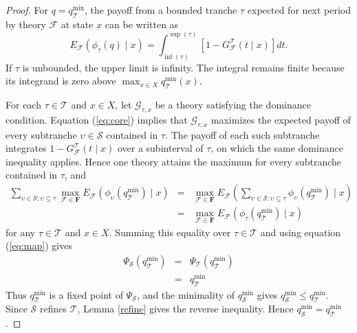 \documentclass[11pt]{article}
\theoremstyle{plain}
\begin{document}
\begin{proof}
For $q=q_{\mathcal{T}}^{\min}$, the payoff from a bounded tranche $\tau$ expected for next period by theory $\mathcal{F}$ at state $x$ can be written as
\begin{equation}
E_{\mathcal{F}}
\left(\phi_\tau(q)\mid x\right)
=
\int_{\inf(\tau)}^{\sup(\tau)}
\left[1-G^\mathcal{T}_{\mathcal{F}}\left(t\mid x\right)\right]dt.
\label{eq:core}
\end{equation}
If $\tau$ is unbounded, the upper limit is infinity. The integral remains finite because its integrand is zero above $\max_{x\in X}q_{\mathcal{T}}^{\min}(x)$.

For each $\tau\in\mathcal{T}$ and $x\in X$, let $\mathcal{G}_{\tau,x}$ be a theory satisfying the dominance condition. Equation (\ref{eq:core}) implies that $\mathcal{G}_{\tau,x}$ maximizes the expected payoff of every subtranche $\upsilon\in\mathcal{S}$ contained in $\tau$. The payoff of each such subtranche integrates $1-G^{\mathcal{T}}_{\mathcal{F}}(t\mid x)$ over a subinterval of $\tau$, on which the same dominance inequality applies. Hence one theory attains the maximum for every subtranche contained in $\tau$, and
\begin{eqnarray*}
\sum_{\upsilon \in \mathcal{S} : \upsilon\subseteq \tau}
\max_{\mathcal{F}\in\mathbf{F}}
E_{\mathcal{F}}
\left( \phi_{\upsilon} \left(q_{\mathcal{T}}^{\min} \right)\mid x
\right)
& = &
\max_{\mathcal{F}\in\mathbf{F}}
E_{\mathcal{F}}
\left(
\sum_{\upsilon \in \mathcal{S} : \upsilon\subseteq \tau}
\phi_{\upsilon} \left(q_{\mathcal{T}}^{\min} \right)\mid x
\right)
\\
& = &
\max_{\mathcal{F}\in\mathbf{F}}
E_{\mathcal{F}}
\left(
\phi_{\tau} \left(q_{\mathcal{T}}^{\min} \right)\mid x
\right)
\end{eqnarray*}
for any $\tau\in\mathcal{T}$ and $x\in X$. Summing this equality over $\tau\in\mathcal{T}$ and using equation (\ref{eq:map}) gives
\begin{eqnarray*}
\Psi_{\mathcal{S} }
\left(q_{\mathcal{T}}^{\min}\right) & = &
\Psi_{\mathcal{T} }
\left(q_{\mathcal{T}}^{\min}\right) \\ & = &
q_{\mathcal{T}}^{\min}
\end{eqnarray*}
Thus $q_{\mathcal{T}}^{\min}$ is a fixed point of $\Psi_{\mathcal{S}}$, and the minimality of $q_{\mathcal{S}}^{\min}$ gives $q_{\mathcal{S}}^{\min}\leq q_{\mathcal{T}}^{\min}$. Since $\mathcal{S}$ refines $\mathcal{T}$, Lemma \ref{refine} gives the reverse inequality. Hence $q_{\mathcal{S}}^{\min}=q_{\mathcal{T}}^{\min}$.
\end{proof}
\end{document}
